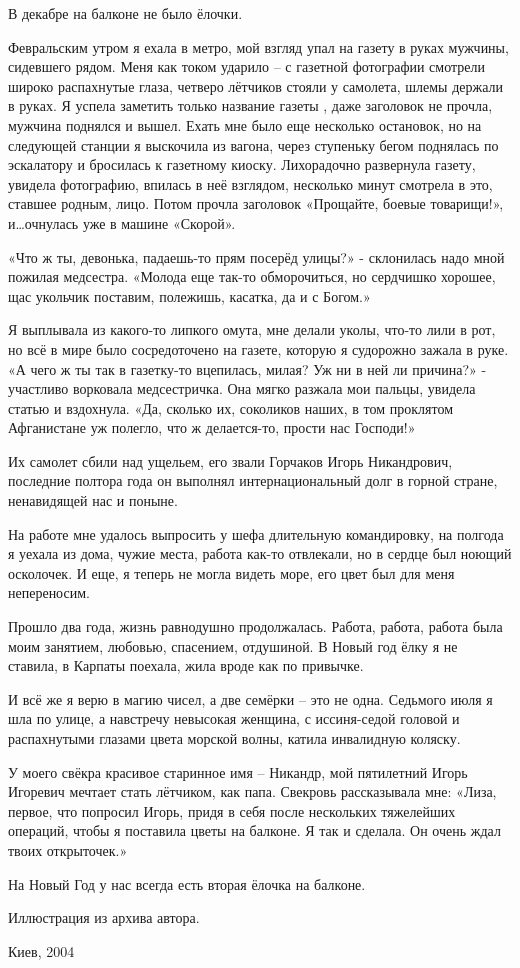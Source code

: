 В декабре на балконе не было ёлочки.

Февральским утром я ехала в метро, мой взгляд упал на газету в руках мужчины,
сидевшего рядом. Меня как током ударило – с газетной фотографии смотрели широко
распахнутые глаза, четверо лётчиков стояли у самолета, шлемы держали в руках. Я
успела заметить только название газеты , даже заголовок не прочла, мужчина
поднялся и вышел. Ехать мне было еще несколько остановок, но на следующей
станции я выскочила из вагона, через ступеньку бегом поднялась по эскалатору и
бросилась к газетному киоску. Лихорадочно развернула газету, увидела
фотографию, впилась в неё взглядом, несколько минут смотрела в это, ставшее
родным, лицо. Потом прочла заголовок «Прощайте, боевые товарищи!», и…очнулась
уже в машине «Скорой».

«Что ж ты, девонька, падаешь-то прям посерёд улицы?» - склонилась надо мной
пожилая медсестра. «Молода еще так-то обморочиться, но сердчишко хорошее, щас
укольчик поставим, полежишь, касатка, да и с Богом.»

Я выплывала из какого-то липкого омута, мне делали уколы, что-то лили в рот, но
всё в мире было сосредоточено на газете, которую я судорожно зажала в руке. «А
чего ж ты так в газетку-то вцепилась, милая? Уж ни в ней ли причина?» -
участливо ворковала медсестричка. Она мягко разжала мои пальцы, увидела статью
и вздохнула. «Да, сколько их, соколиков наших, в том проклятом Афганистане уж
полегло, что ж делается-то, прости нас Господи!»

Их самолет сбили над ущельем, его звали Горчаков Игорь Никандрович, последние
полтора года он выполнял интернациональный долг в горной стране, ненавидящей
нас и поныне.

На работе мне удалось выпросить у шефа длительную командировку, на полгода я
уехала из дома, чужие места, работа как-то отвлекали, но в сердце был ноющий
осколочек. И еще, я теперь не могла видеть море, его цвет был для меня
непереносим.

Прошло два года, жизнь равнодушно продолжалась. Работа, работа, работа была
моим занятием, любовью, спасением, отдушиной. В Новый год ёлку я не ставила, в
Карпаты поехала, жила вроде как по привычке.

И всё же я верю в магию чисел, а две семёрки – это не одна. Седьмого июля я шла
по улице, а навстречу невысокая женщина, с иссиня-седой головой и распахнутыми
глазами цвета морской волны, катила инвалидную коляску.

У моего свёкра красивое старинное имя – Никандр, мой пятилетний Игорь Игоревич
мечтает стать лётчиком, как папа. Свекровь рассказывала мне: «Лиза, первое, что
попросил Игорь, придя в себя после нескольких тяжелейших операций, чтобы я
поставила цветы на балконе. Я так и сделала. Он очень ждал твоих открыточек.»

На Новый Год у нас всегда есть вторая ёлочка на балконе.

Иллюстрация из архива автора.

Киев, 2004

